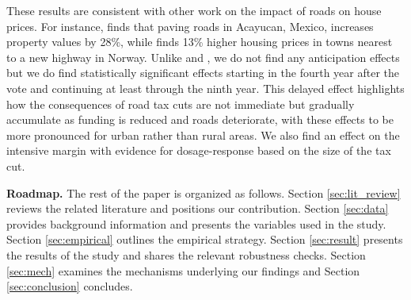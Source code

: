 These results are consistent with other work on the impact of roads on house prices. For instance, \cite{gonzalez2016paving} finds that paving roads in Acayucan, Mexico, increases property values by 28\%, while \cite{theisen2021road} finds 13\% higher housing prices in towns nearest to a new highway in Norway.
Unlike \cite{beenstock2016hedonic} and \cite{diao2017spatial}, we do not find any anticipation effects but we do find statistically significant effects starting in the fourth year after the vote and continuing at least through the ninth year. This delayed effect highlights how the consequences of road tax cuts are not immediate but gradually accumulate as funding is reduced and roads deteriorate, with these effects to be more pronounced for urban rather than rural areas. We also find an effect on the intensive margin with evidence for dosage-response based on the size of the tax cut. 

{\bf Roadmap.} The rest of the paper is organized as follows. Section \ref{sec:lit_review} reviews the related literature and positions our contribution. Section \ref{sec:data} provides background information and presents the variables used in the study. Section \ref{sec:empirical} outlines the empirical strategy. Section \ref{sec:result} presents the results of the study and shares the relevant robustness checks. Section \ref{sec:mech} examines the mechanisms underlying our findings and Section \ref{sec:conclusion} concludes. 




 
